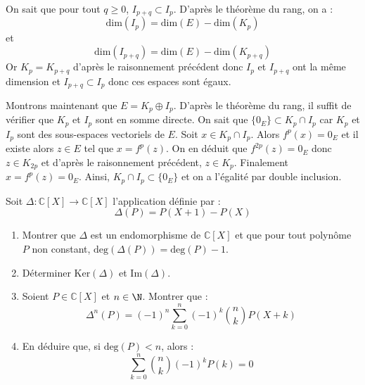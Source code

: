 \documentclass[a4paper,10pt]{report}
\begin{document}
\begin{enumerate}
\medskip

\noindent On sait que pour tout $q \geq 0$, $I_{p+q} \subset I_{p}$. D'après le théorème du rang, on a :
$$ \textrm{dim}(I_p) = \textrm{dim}(E) - \textrm{dim}(K_p)$$
et 
$$ \textrm{dim}(I_{p+q}) = \textrm{dim}(E) - \textrm{dim}(K_{p+q})$$
Or $K_p = K_{p+q}$ d'après le raisonnement précédent donc $I_p$ et $I_{p+q}$ ont la même dimension et $I_{p+q} \subset I_{p}$ donc ces espaces sont égaux.

\medskip

\noindent Montrons maintenant que $E = K_p \oplus I_p$. D'après le théorème du rang, il suffit de vérifier que $K_p$ et $I_p$ sont en somme directe. On sait que $\lbrace 0_E \rbrace \subset  K_p \cap I_p$ car $K_p$ et $I_p$ sont des sous-espaces vectoriels de $E$. Soit $x \in  K_p \cap I_p$. Alors $f^p(x)=0_E$ et il existe alors $z \in E$ tel que $x=f^p(z)$. On en déduit que $f^{2p}(z)=0_E$ donc $z \in K_{2p}$ et d'après le raisonnement précédent, $z \in K_p$. Finalement $x=f^p(z)=0_E$. Ainsi, $K_p \cap I_p \subset \lbrace 0_E \rbrace $ et on a l'égalité par double inclusion.    

\end{enumerate}

\medskip


\begin{Exa} Soit $\Delta : \mathbb{C}[X] \rightarrow \mathbb{C}[X]$ l'application définie par :
  \[
  \Delta (P ) = P( X + 1 ) - P(X )
  \]
  \begin{enumerate}
  \item
    Montrer que $\Delta$ est un endomorphisme de $\mathbb{C}[X]$ et que pour tout polynôme $P$ non constant, $\textrm{deg} ( \Delta(P)) = \textrm{deg}(P) - 1$.
  \item
    Déterminer $\textrm{Ker}(\Delta)$ et $\textrm{Im}(\Delta)$.
  \item Soient $P \in \mathbb{C}[X]$ et $n \in \N$. Montrer que :
    \[
    \Delta^{n}(P) = ( - 1)^{n} \sum_{k = 0}^{n} ( - 1)^{k} \binom{n}{k}P(X + k)
    \]
  \item En déduire que, si $\textrm{deg}(P) < n$, alors :
    \[
    \sum_{k = 0}^{n} \binom{n}{k}( - 1)^{k} P(k) = 0 
    \]
  \end{enumerate}
\end{Exa} 

\corr 
\end{document}
